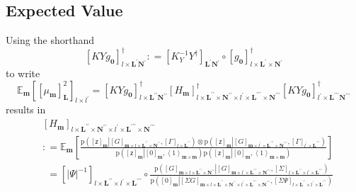\documentclass[preprint,12pt]{elsarticle}
\newcommand*{\M}[1]{\ensuremath{#1}\xspace}
\newcommand*{\x}{\times}
\newcommand*{\mi}[1]{\mathbf{#1}}
\newcommand*{\rv}[1]{\mathsf{#1}}
\newcommand*{\te}[2][]{\left\lbrack{#2}\right\rbrack_{#1}}
\newcommand*{\diag}[2][]{\left\langle{#2}\right\rangle_{#1}}
\newcommand*{\prob}[3]{\M{\mathrm{p}\!\left(\left.{#1}\right\vert{#2,#3}\right)}}
\newcommand*{\deq}{\M{\mathrel{\mathop:}=}}
\newcommand*{\ev}[3][]{\mathbb{E}_{#3}^{#1}\!\left\lbrack{#2}\right\rbrack}
\newcommand*{\evt}[3][]{\mathbb{E}_{#3}^{#1}\!#2}
\newcommand*{\modulus}[1]{\M{\left\lvert{#1}\right\rvert}}
\begin{document}
    \subsection{Expected Value}\label{sub:GPEst:Expectation}
    Using the shorthand
    \begin{equation*}
        \te[l\x\mi{L^{\prime}}\mi{N^{\prime}}]{KY\!g_{\mi{0}}}^{\dagger} \deq \te[\mi{L^{\prime}}\mi{N^{\prime}}]{K_{Y}^{-1} Y^{\dagger}} \circ \te[l\x\mi{L^{\prime}}\x\mi{N^{\prime}}]{g_{\mi{0}}}^{\dagger}
    \end{equation*}
    to write
    \begin{equation*}                
        \evt{\te[l\x l^{\prime}]{\te[\mi{L}]{\mu_{\mi{m}}}^{2}}}{\mi{m}} 
        = \te[l\x\mi{L^{\prime\prime}}\mi{N^{\prime\prime}}]{KY\!g_{\mi{0}}}^{\dagger}
        \te[l\x\mi{L^{\prime\prime}}\x\mi{N^{\prime\prime}} \x l^{\prime}\x\mi{L^{\prime\prime\prime}}\x\mi{N^{\prime\prime\prime}}]{H_{\mi{m}}}^{\dagger}
        \te[l^{\prime}\x\mi{L^{\prime\prime\prime}}\mi{N^{\prime\prime\prime}}]{KY\!g_{\mi{0}}}^{\dagger}
    \end{equation*}
    results in
    \begin{align*}
        &\te[l\x\mi{L^{\prime\prime}}\x\mi{N^{\prime\prime}} \x l^{\prime}\x\mi{L^{\prime\prime\prime}}\x\mi{N^{\prime\prime\prime}}]{H_{\mi{m}}} \\
        &\deq \ev{\frac{
            \prob{\te[\mi{m}]{\rv{z}}}{\te[\mi{m}\x l\x \mi{L^{\prime\prime}\x N^{\prime\prime}}]{G}}{\te[l\x \mi{L^{\prime\prime}}]{\Gamma}} \otimes
            \prob{\te[\mi{m}]{\rv{z}}}{\te[\mi{m}\x l^{\prime}\x \mi{L^{\prime\prime\prime}\x N^{\prime\prime\prime}}]{G}}{\te[l^{\prime}\x\mi{L^{\prime\prime\prime}}]{\Gamma}}}
        {\prob{\te[\mi{m}]{\rv{z}}}{\te[\mi{m}]{0}}{\diag[\mi{m\x m}]{1}}
        \prob{\te[\mi{m}]{\rv{z}}}{\te[\mi{m}]{0}}{\diag[\mi{m\x m}]{1}}}}{\mi{m}} \\
        &\phantom{:}=
        \te[l\x \mi{L^{\prime\prime}}\x l^{\prime}\x \mi{L^{\prime\prime\prime}}]{\modulus{\Psi}^{-1}} \circ
        \frac{
            \prob{\te[\mi{m}\x l\x\mi{L^{\prime\prime}}\x\mi{N^{\prime\prime}}]{G}}
            {\te[\mi{m}\x l^{\prime}\x\mi{L^{\prime\prime\prime}}\x\mi{N^{\prime\prime\prime}}]{G}}
            {\te[l \x\mi{L^{\prime\prime}}\x l^{\prime}\x\mi{L^{\prime\prime\prime}}]{\Sigma}}
            }
        {\prob{\te[\mi{m}]{0}}
        {\te[\mi{m}\x l\x\mi{L^{\prime\prime}}\x\mi{N^{\prime\prime}}\x l^{\prime}\x\mi{L^{\prime\prime\prime}}\x\mi{N^{\prime\prime\prime}}]{\Sigma G}}{\te[l \x\mi{L^{\prime\prime}}\x l^{\prime}\x\mi{L^{\prime\prime\prime}}]{\Sigma\Psi}}}
    \end{align*}
\end{document}
